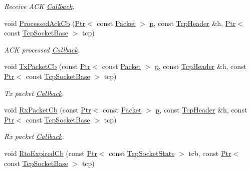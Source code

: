 \begin{DoxyCompactItemize}
\begin{DoxyCompactList}\small\item\em Receive A\+CK \hyperlink{classns3_1_1Callback}{Callback}. \end{DoxyCompactList}\item 
void \hyperlink{classns3_1_1TcpGeneralTest_af88a3e0b2df93ce521e1b83ae9e4ef76}{Processed\+Ack\+Cb} (\hyperlink{classns3_1_1Ptr}{Ptr}$<$ const \hyperlink{classns3_1_1Packet}{Packet} $>$ \hyperlink{lte__link__budget__x2__handover__measures_8m_ac9de518908a968428863f829398a4e62}{p}, const \hyperlink{classns3_1_1TcpHeader}{Tcp\+Header} \&h, \hyperlink{classns3_1_1Ptr}{Ptr}$<$ const \hyperlink{classns3_1_1TcpSocketBase}{Tcp\+Socket\+Base} $>$ tcp)
\begin{DoxyCompactList}\small\item\em A\+CK processed \hyperlink{classns3_1_1Callback}{Callback}. \end{DoxyCompactList}\item 
void \hyperlink{classns3_1_1TcpGeneralTest_a30a61d36128b5647900cd3f869568808}{Tx\+Packet\+Cb} (const \hyperlink{classns3_1_1Ptr}{Ptr}$<$ const \hyperlink{classns3_1_1Packet}{Packet} $>$ \hyperlink{lte__link__budget__x2__handover__measures_8m_ac9de518908a968428863f829398a4e62}{p}, const \hyperlink{classns3_1_1TcpHeader}{Tcp\+Header} \&h, const \hyperlink{classns3_1_1Ptr}{Ptr}$<$ const \hyperlink{classns3_1_1TcpSocketBase}{Tcp\+Socket\+Base} $>$ tcp)
\begin{DoxyCompactList}\small\item\em Tx packet \hyperlink{classns3_1_1Callback}{Callback}. \end{DoxyCompactList}\item 
void \hyperlink{classns3_1_1TcpGeneralTest_a5ba1f851426b0e761b2c03404b2aa4ff}{Rx\+Packet\+Cb} (const \hyperlink{classns3_1_1Ptr}{Ptr}$<$ const \hyperlink{classns3_1_1Packet}{Packet} $>$ \hyperlink{lte__link__budget__x2__handover__measures_8m_ac9de518908a968428863f829398a4e62}{p}, const \hyperlink{classns3_1_1TcpHeader}{Tcp\+Header} \&h, const \hyperlink{classns3_1_1Ptr}{Ptr}$<$ const \hyperlink{classns3_1_1TcpSocketBase}{Tcp\+Socket\+Base} $>$ tcp)
\begin{DoxyCompactList}\small\item\em Rx packet \hyperlink{classns3_1_1Callback}{Callback}. \end{DoxyCompactList}\item 
void \hyperlink{classns3_1_1TcpGeneralTest_ad0de216fabb1639b4236fc6d1a865418}{Rto\+Expired\+Cb} (const \hyperlink{classns3_1_1Ptr}{Ptr}$<$ const \hyperlink{classns3_1_1TcpSocketState}{Tcp\+Socket\+State} $>$ tcb, const \hyperlink{classns3_1_1Ptr}{Ptr}$<$ const \hyperlink{classns3_1_1TcpSocketBase}{Tcp\+Socket\+Base} $>$ tcp)

\end{DoxyCompactItemize}
